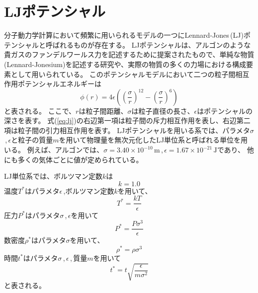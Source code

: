 \documentclass[titlepage]{jsreport}
\begin{document}
\section{LJポテンシャル}\label{principle-sec:LJ}
分子動力学計算において頻繁に用いられるモデルの一つにLennard-Jones\,(LJ)ポテンシャルと呼ばれるものが存在する。
LJポテンシャルは、アルゴンのような貴ガスのファンデルワールス力を記述するために提案された\cite{lennard-jones}もので、単純な物質(Lennard-Jonesium)を記述する研究\cite{lennard-jonesium-1,lennard-jonesium-2}や、実際の物質の多くの力場における構成要素\cite{lennard-jones-force-field-1,lennard-jones-force-field-2, lennard-jones-force-field-3}として用いられている。
このポテンシャルモデルにおいて二つの粒子間相互作用ポテンシャルエネルギーは
\large
\begin{equation}
\phi(r)=4{\epsilon}\left(\left(\frac{\sigma}{r}\right)^{12}-\left(\frac{\sigma}{r}\right)^6\right)\label{eq:lj}
\end{equation}
\normalsize
と表される。
ここで、$r$は粒子間距離、${\sigma}$は粒子直径の長さ、${\epsilon}$はポテンシャルの深さを表す。
式(\ref{eq:lj})の右辺第一項は粒子間の斥力相互作用を表し、右辺第二項は粒子間の引力相互作用を表す。
LJポテンシャルを用いる系では、パラメタ$\sigma$\,,\,$\epsilon$と粒子の質量$m$を用いて物理量を無次元化したLJ単位系と呼ばれる単位を用いる。
例えば、アルゴンでは、${\sigma}=3.40×10^{-10}\,\mathrm{m}$\,,\,${\epsilon}=1.67×10^{-21}\,\mathrm{J}$であり\cite{lennard-jones-argon-parameters}、
他にも多くの気体ごとに値が定められている\cite{lennard-jones-many-parameters}。

LJ単位系では、ボルツマン定数$k$は
\large
\begin{equation}
k=1.0\label{eq:k}
\end{equation}
\normalsize
温度$T^*$はパラメタ$\epsilon$\,,ボルツマン定数$k$を用いて、
\large
\begin{equation}
T^*=\frac{kT}{\epsilon}\label{eq:T}
\end{equation}
\normalsize
圧力$P^*$はパラメタ${\sigma}$\,,\,${\epsilon}$を用いて
\large
\begin{equation}
P^*=\frac{P\sigma^3}{\epsilon}\label{eq:P}
\end{equation}
\normalsize
数密度$\rho^*$はパラメタ$\sigma$を用いて、
\large
\begin{equation}
\rho^*=\rho{\sigma}^3\label{eq:rho}
\end{equation}
\normalsize
時間$t^*$はパラメタ${\sigma}$\,,\,${\epsilon}$\,,\,質量$m$を用いて
\large
\begin{equation}
t^*=t\sqrt{\frac{\epsilon}{m{\sigma}^2}}\label{eq:time}
\end{equation}
\normalsize
と表される。
\end{document}
